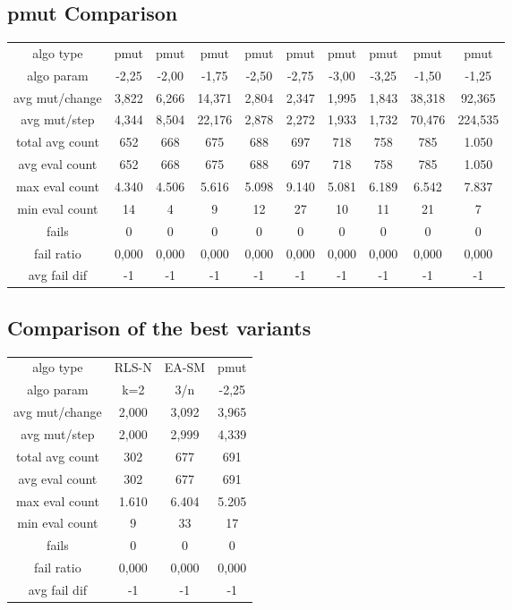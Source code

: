 \subsection{pmut Comparison}
\begin{tabular}[h]{cccccccccc}
algo type&           pmut&    pmut&    pmut&    pmut&    pmut&    pmut&    pmut&    pmut&    pmut\\
algo param&         -2,25&   -2,00&   -1,75&   -2,50&   -2,75&   -3,00&   -3,25&   -1,50&   -1,25\\
avg mut/change&     3,822&   6,266&  14,371&   2,804&   2,347&   1,995&   1,843&  38,318&  92,365\\
avg mut/step&       4,344&   8,504&  22,176&   2,878&   2,272&   1,933&   1,732&  70,476& 224,535\\
\hline
total avg count&      652&     668&     675&     688&     697&     718&     758&     785&   1.050\\
avg eval count&       652&     668&     675&     688&     697&     718&     758&     785&   1.050\\
max eval count&     4.340&   4.506&   5.616&   5.098&   9.140&   5.081&   6.189&   6.542&   7.837\\
min eval count&        14&       4&       9&      12&      27&      10&      11&      21&       7\\
\hline
fails&                  0&       0&       0&       0&       0&       0&       0&       0&       0\\
fail ratio&         0,000&   0,000&   0,000&   0,000&   0,000&   0,000&   0,000&   0,000&   0,000\\
avg fail dif&          -1&      -1&      -1&      -1&      -1&      -1&      -1&      -1&      -1\\
\end{tabular}
\subsection{Comparison of the best variants}
\begin{tabular}[h]{cccc}
algo type&        RLS-N& EA-SM&  pmut\\
algo param&         k=2&   3/n& -2,25\\
avg mut/change&   2,000& 3,092& 3,965\\
avg mut/step&     2,000& 2,999& 4,339\\
\hline
total avg count&    302&   677&   691\\
avg eval count&     302&   677&   691\\
max eval count&   1.610& 6.404& 5.205\\
min eval count&       9&    33&    17\\
\hline
fails&                0&     0&     0\\
fail ratio&       0,000& 0,000& 0,000\\
avg fail dif&        -1&    -1&    -1\\
\end{tabular}
